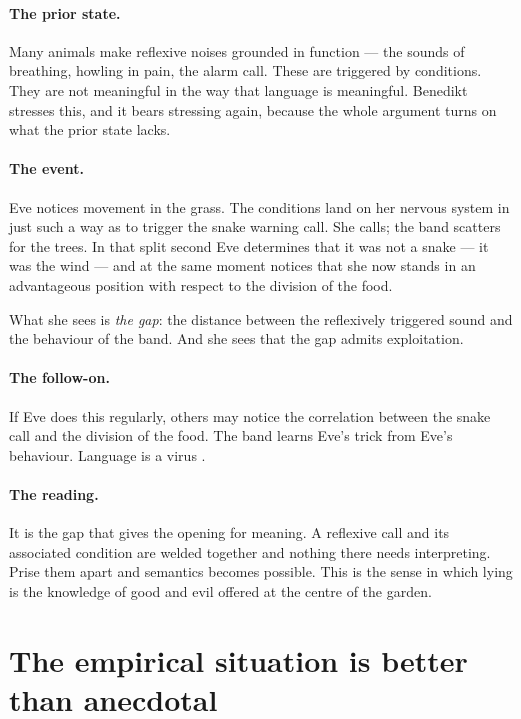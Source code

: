 \documentclass[11pt]{article}
\theoremstyle{plain}
\theoremstyle{definition}
\begin{document}
\paragraph{The prior state.} Many animals make reflexive noises grounded in function --- the sounds of
breathing, howling in pain, the alarm call. These are triggered by conditions. They are not meaningful
in the way that language is meaningful. Benedikt stresses this, and it bears stressing again, because
the whole argument turns on what the prior state lacks.

\paragraph{The event.} Eve notices movement in the grass. The conditions land on her nervous system in
just such a way as to trigger the snake warning call. She calls; the band scatters for the trees. In
that split second Eve determines that it was not a snake --- it was the wind --- and at the same moment
notices that she now stands in an advantageous position with respect to the division of the food.

What she sees is \emph{the gap}: the distance between the reflexively triggered sound and the behaviour
of the band. And she sees that the gap admits exploitation.

\paragraph{The follow-on.} If Eve does this regularly, others may notice the correlation between the
snake call and the division of the food. The band learns Eve's trick from Eve's behaviour. Language is a
virus \cite{burroughs}.

\paragraph{The reading.} It is the gap that gives the opening for meaning. A reflexive call and its
associated condition are welded together and nothing there needs interpreting. Prise them apart and
semantics becomes possible. This is the sense in which lying is the knowledge of good and evil offered
at the centre of the garden.

\section{The empirical situation is better than anecdotal}
\label{sec:empirical}
\end{document}
